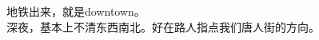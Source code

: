 ﻿\documentclass[hyperref={bookmarks=true},xcolor=pdflatex,svgnames,table,compress]{beamer}
\begin{document}
\subsection{}
\begin{frame}
\end{frame}

\subsection{}
\begin{frame}
\end{frame}

\subsection{}
\begin{frame}
\end{frame}

\subsection{}
\begin{frame}
\begin{ztebox}
地铁出来，就是downtown。\\
深夜，基本上不清东西南北。好在路人指点我们唐人街的方向。
\end{ztebox}
\end{frame}

\subsection{}
\begin{frame}
\end{frame}

\subsection{}
\begin{frame}
\end{frame}

\subsection{}
\begin{frame}
\end{frame}
\end{document}
